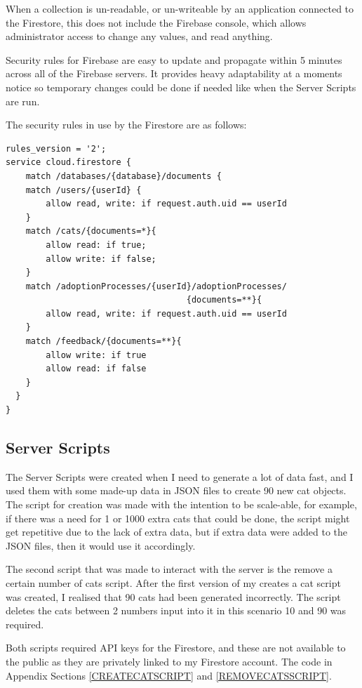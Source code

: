     When a collection is un-readable, or un-writeable by an application connected to the Firestore, this does not include the Firebase console, which allows administrator access to change any values, and read anything.
    
    Security rules for Firebase are easy to update and propagate within 5 minutes across all of the Firebase servers. It provides heavy adaptability at a moments notice so temporary changes could be done if needed like when the Server Scripts are run.
    
    The security rules in use by the Firestore are as follows:
    
\begin{verbatim}
rules_version = '2';
service cloud.firestore {
    match /databases/{database}/documents {
    match /users/{userId} {
        allow read, write: if request.auth.uid == userId
    }
    match /cats/{documents=*}{
        allow read: if true;
        allow write: if false;
    }
    match /adoptionProcesses/{userId}/adoptionProcesses/
                                    {documents=**}{
        allow read, write: if request.auth.uid == userId
    }
    match /feedback/{documents=**}{
        allow write: if true
        allow read: if false
    }
  }
}    
\end{verbatim}

    
    \subsection{Server Scripts} \label{SERVERSCRIPTS}
    The Server Scripts were created when I need to generate a lot of data fast, and I used them with some made-up data in JSON files to create 90 new cat objects. The script for creation was made with the intention to be scale-able, for example, if there was a need for 1 or 1000 extra cats that could be done, the script might get repetitive due to the lack of extra data, but if extra data were added to the JSON files, then it would use it accordingly.
    
    The second script that was made to interact with the server is the remove a certain number of cats script. After the first version of my creates a cat script was created, I realised that 90 cats had been generated incorrectly. The script deletes the cats between 2 numbers input into it in this scenario 10 and 90 was required.
    
    Both scripts required API keys for the Firestore, and these are not available to the public as they are privately linked to my Firestore account. The code in Appendix Sections \ref{CREATECATSCRIPT} and \ref{REMOVECATSSCRIPT}.
    
